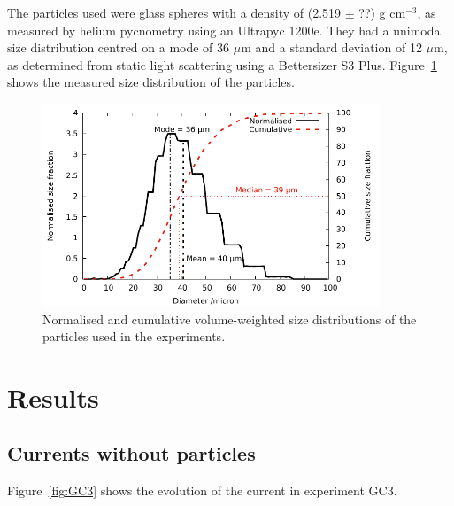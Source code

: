 \documentclass[authoryear,preprint,review,12pt]{elsarticle}
\begin{document}
The particles used were glass spheres with a density of (2.519 $\pm$ ??) g cm$^{-3}$, as measured by helium pycnometry using an Ultrapyc 1200e. They had a unimodal size distribution centred on a mode of 36 $\mu$m and a standard deviation of 12 $\mu$m, as determined from static light scattering using a Bettersizer S3 Plus. Figure~\ref{fig:size_dist} shows the measured size distribution of the particles. 

\begin{figure}[ht!]
  \centerline{\includegraphics[width=0.9\textwidth]{unsieved_dist.pdf}}
  \caption{Normalised and cumulative volume-weighted size distributions of the particles used in the experiments.}
  \label{fig:size_dist}
\end{figure}

\section{Results}
\label{sec:res}

\subsection{Currents without particles}
\label{subsec:res_no_parts}

Figure~\ref{fig:GC3} shows the evolution of the current in experiment GC3.
\end{document}
